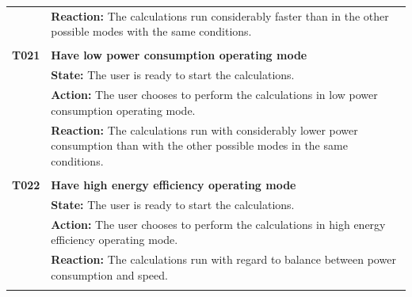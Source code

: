 \documentclass[parskip=full]{scrartcl}
\begin{document}
\begin{tabular}{p{2cm}p{11.4cm}}
& \textbf{Reaction:} The calculations run considerably faster than in the other possible modes with the same conditions.\\
& \\
\textbf{T021} & \textbf{Have low power consumption operating mode}\\
& \textbf{State:} The user is ready to start the calculations.\\
& \textbf{Action:} The user chooses to perform the calculations in low power consumption operating mode.\\
& \textbf{Reaction:} The calculations run with considerably lower power consumption than with the other possible modes in the same conditions.\\
& \\
\textbf{T022} & \textbf{Have high energy efficiency operating mode}\\
& \textbf{State:} The user is ready to start the calculations.\\
& \textbf{Action:} The user chooses to perform the calculations in high energy efficiency operating mode.\\
& \textbf{Reaction:} The calculations run with regard to balance between power consumption and speed.\\
& \\
\end{tabular}
\newpage
\end{document}
